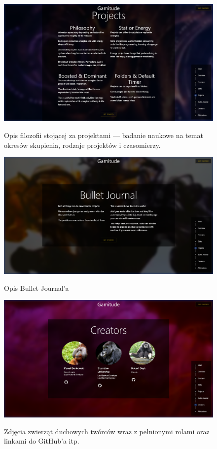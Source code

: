 \documentclass[a4paper,11pt]{report}
\begin{document}
\begin{figure}[H]
	\centering
	\includegraphics[scale=0.3]{prezentacja/Homepage_Projects}\\
	\caption{Opis filozofii stojącej za projektami — badanie naukowe na temat okresów skupienia, rodzaje projektów i czasomierzy.}
	\label{fig:homepage_projects}
\end{figure}
\begin{figure}[H]
	\centering
	\includegraphics[scale=0.3]{prezentacja/Homepage_Bullet}\\
	\caption{Opis Bullet Journal'a}
	\label{fig:homepage_bullet}
\end{figure}
\begin{figure}[H]
	\centering
	\includegraphics[scale=0.3]{prezentacja/Homepage_Creators}\\
	\caption{Zdjęcia zwierząt duchowych twórców wraz z pełnionymi rolami oraz linkami do GitHub'a itp.}
	\label{fig:homepage_creators}
\end{figure}
\end{document}
